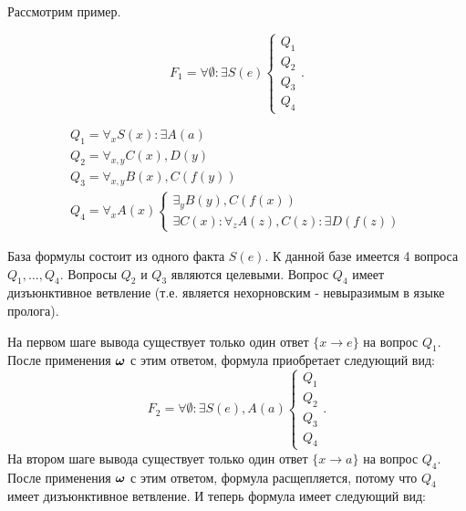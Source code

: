 %


Рассмотрим пример.

\begin{example}\label{proofexample}


\begin{equation*}\label{ex:f1}
	F_1 = \forall \emptyset\colon \exists S(e)	
	\left\lbrace
	\begin{array}{l}
		Q_1 \\
		Q_2 \\
		Q_3 \\
		Q_4
	\end{array}\right..
\end{equation*}

\begin{equation*}
	\begin{array}{l}
	Q_1 = \forall_x S(x)\colon \exists A(a) \\
	Q_2 = \forall_{x,y} C(x),D(y) \\
	Q_3 = \forall_{x,y} B(x),C(f(y)) \\
	Q_4 =
	\forall_x A(x)
	\left\lbrace
	\begin{array}{l}
		\exists_y B(y),C(f(x)) \\
		\exists C(x): \forall_z A(z),C(z)\colon \exists D(f(z))
	\end{array}\right.
	\end{array}
\end{equation*}

База формулы состоит из одного факта $S(e)$. К данной базе имеется 4 вопроса $Q_1,\ldots,Q_4$. Вопросы $Q_2$ и $Q_3$ являются целевыми. Вопрос $Q_4$ имеет дизъюнктивное ветвление (т.е. является нехорновским - невыразимым в языке пролога).

На первом шаге вывода существует только один ответ $\{x \rightarrow e\}$ на вопрос $Q_1$. После применения $\boldsymbol{\omega}$ с этим ответом, формула приобретает следующий вид:
\begin{equation*}\label{ex:f2}
	F_2 = \forall \emptyset\colon \exists S(e),A(a)
	\left\lbrace
	\begin{array}{l}
		Q_1 \\
		Q_2 \\
		Q_3 \\
		Q_4
	\end{array}\right..	
\end{equation*}
На втором шаге вывода существует только один ответ $\{x \rightarrow a\}$ на вопрос $Q_4$. После применения $\boldsymbol{\omega}$ с этим ответом, формула расщепляется, потому что $Q_4$ имеет дизъюнктивное ветвление. И теперь формула имеет следующий вид:


\end{example}
